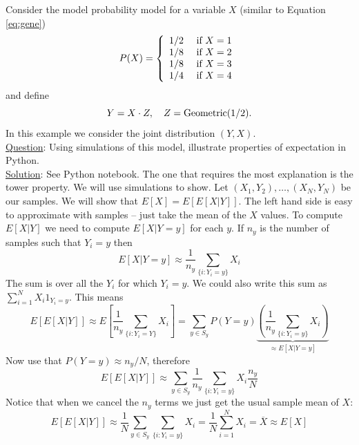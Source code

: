    \begin{example}
Consider the model probability model for a variable $X$ (similar to Equation \ref{eq:gene}) 
\begin{equation*}\label{eq:gene}
P(X) = \left\{ \begin{array}{cc}
1/2 & \text{ if }X=1\\
1/8 & \text{ if }X=2\\
1/8 & \text{ if }X=3\\
1/4 & \text{ if }X=4
\end{array}
 \right.\\
 \end{equation*}
 and define 
 \begin{equation*}
 Y = X\cdot Z,\quad Z = {\rm Geometric}(1/2). 
 \end{equation*}
In this example we consider the joint distribution $(Y,X)$. \\


\noindent
\underline{Question}: Using simulations of this model, illustrate properties of expectation in Python.\\

\noindent
\underline{Solution}: See Python notebook. The one that requires the most explanation is the tower property.
We will use simulations to show. Let $(X_1,Y_2),\dots,(X_N,Y_N)$ be our samples. We will show that $E[X] = E[E[X|Y]]$. The left hand side is easy to approximate with samples -- just take the mean of the $X$ values. To compute $E[X|Y]$ we need to compute $E[X|Y=y]$ for each $y$. If $n_y$ is the number of samples such that $Y_i=y$ then 
\begin{equation*}
E[X|Y=y] \approx \frac{1}{n_y}\sum_{\{i:Y_i =y\}}X_i
\end{equation*}
The sum is over all the $Y_i$ for which $Y_i=y$. We could also write this sum as $\sum_{i=1}^NX_i1_{Y_i=y}$. 
This means 
\begin{equation*}
E[E[X|Y]] \approx E\left[ \frac{1}{n_y}\sum_{\{i:Y_i =Y\}}X_i  \right] = \sum_{y \in S_y}P(Y=y)\underbrace{\left(\frac{1}{n_y}\sum_{\{i:Y_i =y\}}X_i  \right)}_{\approx E[X|Y=y]}
\end{equation*}
Now use that $P(Y=y) \approx n_y/N$, therefore 
\begin{equation*}
E[E[X|Y]]  \approx \sum_{y \in S_y}\frac{1}{n_y}\sum_{\{i:Y_i =y\}}X_i  \frac{n_y}{N}
\end{equation*}
Notice that when we cancel the $n_y$ terms we just get the usual sample mean of $X$: 
\begin{equation*}
E[E[X|Y]]  \approx \frac{1}{N} \sum_{y \in S_y}\sum_{\{i:Y_i =y\}}X_i   =  \frac{1}{N}\sum_{i=1}^NX_i = \overline{X} \approx E[X]
\end{equation*}

 \end{example}

